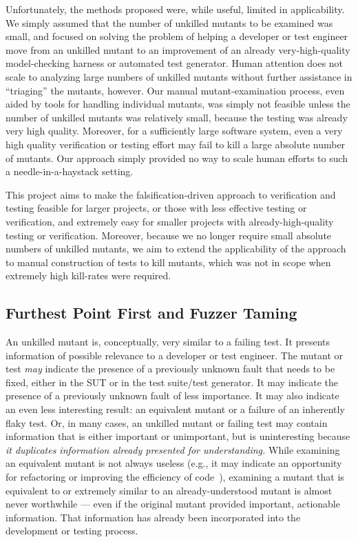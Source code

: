 Unfortunately, the
methods proposed were, while useful, limited in applicability.  We
simply assumed that the number of unkilled mutants to be examined was
small, and focused on solving the problem of helping a developer or
test engineer move from an unkilled mutant to an improvement of an
already very-high-quality
model-checking harness or  automated test generator.  Human
attention does not scale to analyzing large numbers of 
unkilled
mutants without further assistance in ``triaging'' the mutants,
however.  Our manual mutant-examination process, even aided by
tools for handling individual mutants, was simply not feasible unless the number of
unkilled mutants was relatively small, because the testing was already
very high quality.  Moreover, for a sufficiently large software system, even a
very high quality verification or testing effort may fail to kill a
large absolute number of mutants.  Our approach simply provided no way to
scale human efforts to such a needle-in-a-haystack setting. 

This project aims to make the falsification-driven approach to verification and testing feasible for larger
projects, or those with less effective testing or verification, and extremely easy for
smaller projects with already-high-quality testing or verification.
Moreover, because we no longer require small absolute numbers of
unkilled mutants, we aim to extend the applicability of the approach
to manual construction of tests to kill mutants, which was not in
scope when extremely high kill-rates were required.

\subsection{Furthest Point First and Fuzzer Taming}

An unkilled mutant is, conceptually, very similar to a failing test.
It presents information of possible relevance to a developer or test
engineer.  The mutant or test \emph{may} indicate the presence of a
previously unknown fault that needs to be fixed, either in the SUT or in the test suite/test
generator.  It may indicate the presence of a previously unknown fault
of less importance.  It may also indicate an even less interesting
result:  an equivalent mutant or 
a failure of an inherently flaky test.  Or, in many cases, an unkilled
mutant or failing test may contain information that is either
important or unimportant, but is uninteresting because \emph{it
  duplicates information already presented for understanding.}  While
examining an equivalent mutant is not always useless (e.g., it may indicate
an opportunity for refactoring or improving the efficiency of code~\cite{ivankovic2018industrial,groce2018verified}), examining a mutant that is
equivalent to or extremely similar to an already-understood mutant is almost never
worthwhile --- even if the original mutant provided important,
actionable information.  That information has already been
incorporated into the development or testing process.

